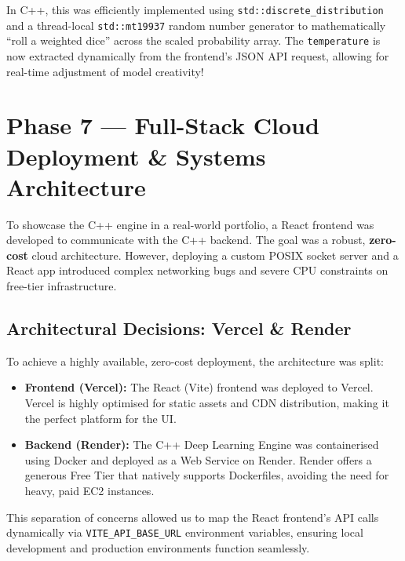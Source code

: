 \documentclass[12pt, a4paper]{article}
\begin{document}
In C++, this was efficiently implemented using \texttt{std::discrete\_distribution} and a thread-local \texttt{std::mt19937} random number generator to mathematically ``roll a weighted dice'' across the scaled probability array. The \texttt{temperature} is now extracted dynamically from the frontend's JSON API request, allowing for real-time adjustment of model creativity!

\newpage
\section{Phase 7 --- Full-Stack Cloud Deployment \& Systems Architecture}

\begin{tcolorbox}[designbox, title={Phase 7 Problem Statement}]
  To showcase the C++ engine in a real-world portfolio, a React frontend was developed to communicate with the C++ backend. The goal was a robust, \textbf{zero-cost} cloud architecture. However, deploying a custom POSIX socket server and a React app introduced complex networking bugs and severe CPU constraints on free-tier infrastructure.
\end{tcolorbox}

\subsection{Architectural Decisions: Vercel \& Render}
To achieve a highly available, zero-cost deployment, the architecture was split:
\begin{itemize}
    \item \textbf{Frontend (Vercel):} The React (Vite) frontend was deployed to Vercel. Vercel is highly optimised for static assets and CDN distribution, making it the perfect platform for the UI.
    \item \textbf{Backend (Render):} The C++ Deep Learning Engine was containerised using Docker and deployed as a Web Service on Render. Render offers a generous Free Tier that natively supports Dockerfiles, avoiding the need for heavy, paid EC2 instances.
\end{itemize}
This separation of concerns allowed us to map the React frontend's API calls dynamically via \texttt{VITE\_API\_BASE\_URL} environment variables, ensuring local development and production environments function seamlessly.
\end{document}
